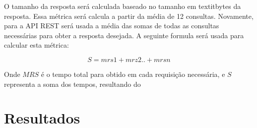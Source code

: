 O tamanho da resposta será calculada baseado no tamanho em textit{bytes} da resposta. Essa métrica será calcula a partir da média de 12 consultas. Novamente, para a API REST será usada a média das somas de todas as consultas necessárias para obter a resposta desejada. A seguinte formula será usada para calcular esta métrica: 

$$S=mrs1+mrz2..+mrsn$$

Onde $MRS$ é o tempo total para obtido em cada requisição necessária, e $S$ representa a soma dos tempos, resultando do 



\section{Resultados} \label{sec:resultados}

